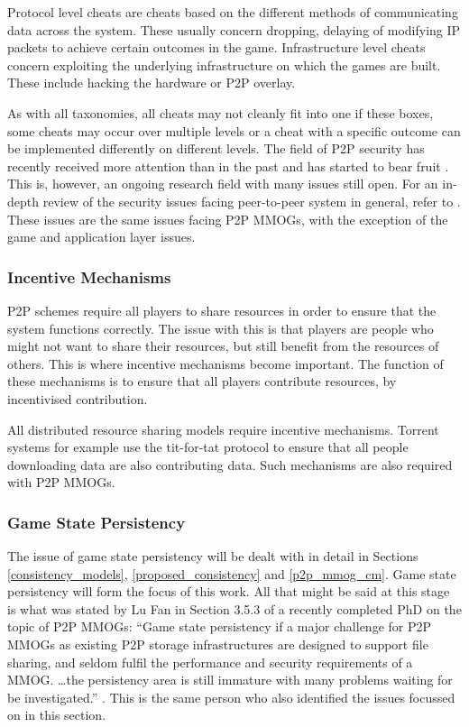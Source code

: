 \documentclass[journal,oneside,a4paper,onecolumn]{IEEEtran}
\begin{document}
Protocol level cheats are cheats based on the different methods of communicating data across the system. These usually concern dropping, delaying of modifying IP packets to achieve certain outcomes in the game. Infrastructure level cheats concern exploiting the underlying infrastructure on which the games are built. These include hacking the hardware or P2P overlay.

As with all taxonomies, all cheats may not cleanly fit into one if these boxes, some cheats may occur over multiple levels or a cheat with a specific outcome can be implemented differently on different levels. The field of P2P security has recently received more attention than in the past and has started to bear fruit \cite{survey_p2p_game_cheats}. This is, however, an ongoing research field with many issues still open. For an in-depth review of the security issues facing peer-to-peer system in general, refer to \cite{p2p_security_issues}. These issues are the same issues facing P2P MMOGs, with the exception of the game and application layer issues.

\subsubsection{Incentive Mechanisms}

P2P schemes require all players to share resources in order to ensure that the system functions correctly. The issue with this is that players are people who might not want to share their resources, but still benefit from the resources of others. This is where incentive mechanisms become important. The function of these mechanisms is to ensure that all players contribute resources, by incentivised contribution.

All distributed resource sharing models require incentive mechanisms. Torrent systems for example use the tit-for-tat protocol \cite{} to ensure that all people downloading data are also contributing data. Such mechanisms are also required with P2P MMOGs.

\cite{classic_p2p_reputation} \cite{proactive_reputation}

\subsubsection{Game State Persistency}

The issue of game state persistency will be dealt with in detail in Sections \ref{consistency_models}, \ref{proposed_consistency} and \ref{p2p_mmog_cm}. Game state persistency will form the focus of this work. All that might be said at this stage is what was stated by Lu Fan in Section 3.5.3 of a recently completed PhD on the topic of P2P MMOGs: ``Game state persistency if a major challenge for P2P MMOGs as existing P2P storage infrastructures are designed to support file sharing, and seldom fulfil the performance and security requirements of a MMOG. \ldots the persistency area is still immature with many problems waiting for be investigated.'' \cite{Fan_phd}. This is the same person who also identified the issues focussed on in this section.
\end{document}
